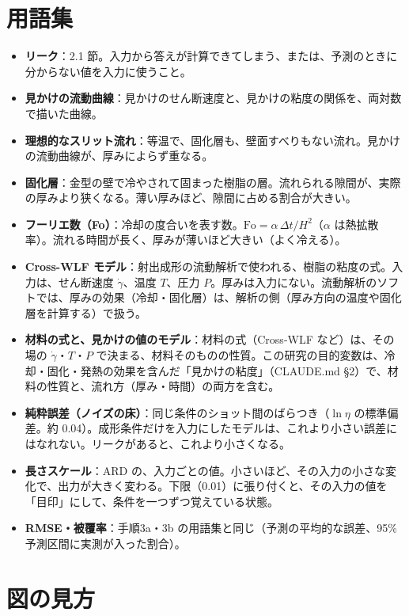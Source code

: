 \documentclass[paper=a4paper,fontsize=10.5pt,line_length=44zw,number_of_lines=38]{jlreq}
\newcommand{\gd}{\dot{\gamma}}
\newenvironment{termlist}{\begin{itemize}[label=・,leftmargin=1\zw,labelwidth=1\zw,labelsep=0pt,itemsep=0.4ex,topsep=0.6ex,parsep=0pt]}{\end{itemize}}
\newcommand{\term}[1]{\item \textbf{#1}：}
\begin{document}
\section{用語集}
\begin{termlist}
\term{リーク}2.1 節。入力から答えが計算できてしまう、または、予測のときに分からない値を入力に使うこと。
\term{見かけの流動曲線}見かけのせん断速度と、見かけの粘度の関係を、両対数で描いた曲線。
\term{理想的なスリット流れ}等温で、固化層も、壁面すべりもない流れ。見かけの流動曲線が、厚みによらず重なる。
\term{固化層}金型の壁で冷やされて固まった樹脂の層。流れられる隙間が、実際の厚みより狭くなる。薄い厚みほど、隙間に占める割合が大きい。
\term{フーリエ数（Fo）}冷却の度合いを表す数。$\mathrm{Fo} = \alpha\,\Delta t/H^2$（$\alpha$ は熱拡散率）。流れる時間が長く、厚みが薄いほど大きい（よく冷える）。
\term{Cross-WLF モデル}射出成形の流動解析で使われる、樹脂の粘度の式。入力は、せん断速度 $\gd$、温度 $T$、圧力 $P$。厚みは入力にない。流動解析のソフトでは、厚みの効果（冷却・固化層）は、解析の側（厚み方向の温度や固化層を計算する）で扱う。
\term{材料の式と、見かけの値のモデル}材料の式（Cross-WLF など）は、その場の $\gd$・$T$・$P$ で決まる、材料そのものの性質。この研究の目的変数は、冷却・固化・発熱の効果を含んだ「見かけの粘度」（CLAUDE.md §2）で、材料の性質と、流れ方（厚み・時間）の両方を含む。
\term{純粋誤差（ノイズの床）}同じ条件のショット間のばらつき（$\ln\eta$ の標準偏差。約 0.04）。成形条件だけを入力にしたモデルは、これより小さい誤差にはなれない。リークがあると、これより小さくなる。
\term{長さスケール}ARD の、入力ごとの値。小さいほど、その入力の小さな変化で、出力が大きく変わる。下限（0.01）に張り付くと、その入力の値を「目印」にして、条件を一つずつ覚えている状態。
\term{RMSE・被覆率}手順3a・3b の用語集と同じ（予測の平均的な誤差、95\% 予測区間に実測が入った割合）。
\end{termlist}

\section{図の見方}

\end{document}
